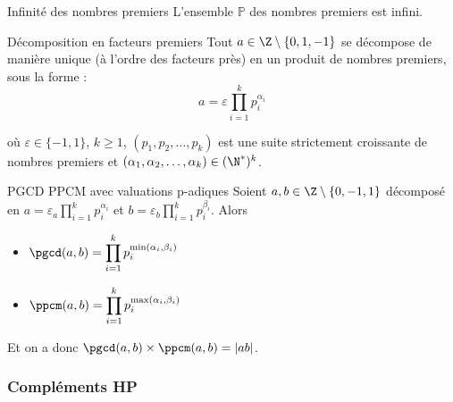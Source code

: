 \begin{proposition}{Infinité des nombres premiers}{}
    L'ensemble $\mathbb{P}$ des nombres premiers est infini.
\end{proposition}

\begin{theoreme}{Décomposition en facteurs premiers}{}
    Tout $a \in \Z \setminus \{0, 1, -1\}$ se décompose de manière unique (à l'ordre des facteurs près) en un produit
    de nombres premiers, sous la forme : 
    \[
        a = \varepsilon \prod_{i = 1}^k p_i^{\alpha_i} 
    \]

    où $\varepsilon \in \{-1, 1\}$, $k \geqslant 1$, $(p_1, p_2, \ldots, p_k)$ est une suite strictement croissante de nombres premiers
    et $(\alpha_1, \alpha_2, \ldots, \alpha_k) \in (\N^*)^k$.
    
\end{theoreme}


\lvspace \avspace \begin{proposition}{PGCD PPCM avec valuations p-adiques}{}
    Soient $a, b \in \Z \setminus \{0, -1, 1\}$ décomposé en 
    $\displaystyle a = \varepsilon_a \prod_{i = 1}^k p_i^{\alpha_i}$ et
    $\displaystyle b = \varepsilon_b \prod_{i = 1}^k p_i^{\beta_i}$. 
    Alors 
    
    \begin{itemize}
        \item $\displaystyle \pgcd(a, b) = \prod_{i = 1}^k p_i^{\min(\alpha_i, \beta_i)}$
        \item $\displaystyle \ppcm(a, b) = \prod_{i = 1}^k p_i^{\max(\alpha_i, \beta_i)}$
    \end{itemize} 
    
    Et on a donc $\displaystyle \pgcd(a, b) \times \ppcm(a, b) = |ab|$.
\end{proposition}

\subsubsection{Compléments HP}

